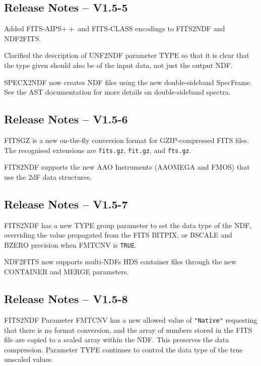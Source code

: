 \documentclass[twoside,11pt]{article}
\newcommand{\htmlref}[2]{#1}
\begin{document}
\subsection{Release Notes -- V1.5-5}

Added FITS-AIPS$++$ and FITS-CLASS encodings to 
\htmlref{FITS2NDF}{FITS2NDF} and \htmlref{NDF2FITS}{NDF2FITS}.

Clarified the description of \htmlref{UNF2NDF}{UNF2NDF} parameter TYPE
so that it is clear that the type given should also be of the input
data, not just the output NDF.

\htmlref{SPECX2NDF}{SPECX2NDF} now creates NDF files using the new
double-sideband SpecFrame.  See the AST documentation for more details
on double-sideband spectra.

\subsection{Release Notes -- V1.5-6}

FITSGZ is a new on-the-fly conversion format for GZIP-compressed FITS
files.  The recognised extensions are \texttt{fits.gz}, \texttt{fit.gz}, and
\texttt{fts.gz}.

FITS2NDF supports the new AAO Instruments (AAOMEGA and FMOS) that use
the 2dF data structures.
  
\subsection{Release Notes -- V1.5-7}

\htmlref{FITS2NDF}{FITS2NDF} has a new TYPE group parameter to set the
data type of the NDF, overriding the value propagated from the FITS
BITPIX, or BSCALE and BZERO precision when FMTCNV is \texttt{TRUE}.

\htmlref{NDF2FITS}{NDF2FITS} now supports multi-NDFs HDS container files
through the new CONTAINER and MERGE parameters.

\subsection{Release Notes -- V1.5-8}

\htmlref{FITS2NDF}{FITS2NDF} Parameter FMTCNV has a new allowed value
of \texttt{"Native"} requesting that there is no format conversion, and
the array of numbers stored in the FITS file are copied to a scaled array
within the NDF.  This preserves the data compression.  Parameter TYPE
continues to control the data type of the true unscaled values.
\end{document}
